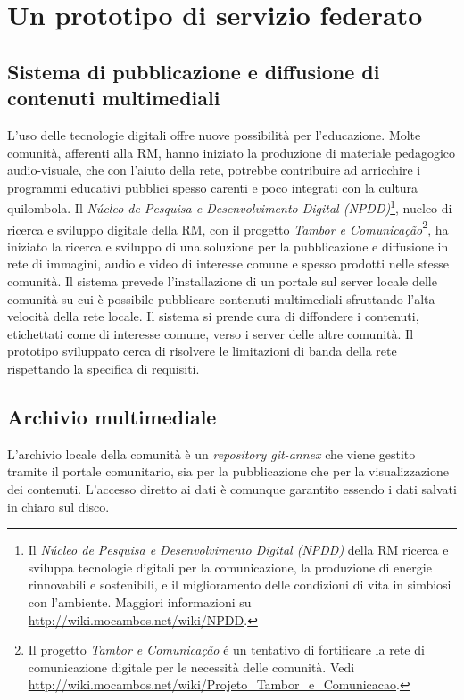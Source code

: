 
\chapter{Un prototipo di servizio federato}
\label{Capitolo3}

\section{Sistema di pubblicazione e diffusione di contenuti
  multimediali}
L'uso delle tecnologie digitali offre nuove possibilità per
l'educazione. Molte comunità, afferenti alla RM, hanno iniziato la
produzione di materiale pedagogico audio-visuale, che con l'aiuto
della rete, potrebbe contribuire ad arricchire i programmi educativi
pubblici spesso carenti e poco integrati con la cultura quilombola. Il
\emph{Núcleo de Pesquisa e Desenvolvimento Digital (NPDD)}\footnote{Il
  \emph{Núcleo de Pesquisa e Desenvolvimento Digital (NPDD)} della RM
  ricerca e sviluppa tecnologie digitali per la comunicazione, la
  produzione di energie rinnovabili e sostenibili, e il miglioramento
  delle condizioni di vita in simbiosi con l'ambiente. Maggiori
  informazioni su \url{http://wiki.mocambos.net/wiki/NPDD}.}, nucleo
di ricerca e sviluppo digitale della RM, con il progetto \emph{Tambor
  e Comunicação}\footnote{Il progetto \emph{Tambor e Comunicação} é un
  tentativo di fortificare la rete di comunicazione digitale per le
  necessità delle comunità. Vedi
  \url{http://wiki.mocambos.net/wiki/Projeto_Tambor_e_Comunicacao}.},
ha iniziato la ricerca e sviluppo di una soluzione per la
pubblicazione e diffusione in rete di immagini, audio e video di
interesse comune e spesso prodotti nelle stesse comunità. Il sistema
prevede l'installazione di un portale sul server locale delle comunità
su cui è possibile pubblicare contenuti multimediali sfruttando l'alta
velocità della rete locale. Il sistema si prende cura di diffondere i
contenuti, etichettati come di interesse comune, verso i server delle
altre comunità. Il prototipo sviluppato cerca di risolvere le
limitazioni di banda della rete rispettando la specifica di requisiti.

\section{Archivio multimediale}
L'archivio locale della comunità è un \emph{repository git-annex} che
viene gestito tramite il portale comunitario, sia per la pubblicazione
che per la visualizzazione dei contenuti. L'accesso diretto ai dati è
comunque garantito essendo i dati salvati in chiaro sul disco.

